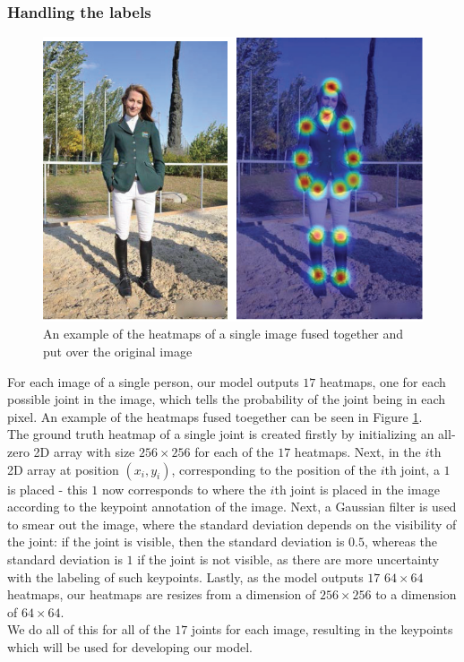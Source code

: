 \documentclass[main.tex]{subfiles}
\begin{document}
\subsubsection{Handling the labels}
\begin{figure}[H]
    \centering
    \includegraphics[height = 4 cm]{./entities/heatmaps_ex.PNG}
    \caption{An example of the heatmaps of a single image fused together and put over the original image \cite{survey_1}}
    \label{fig:heatmaps_ex}
\end{figure}
For each image of a single person, our model outputs $17$ heatmaps, one for each possible joint in the image, which tells the probability of the joint being in each pixel. An example of the heatmaps fused toegether can be seen in Figure \ref{fig:heatmaps_ex}. \\
The ground truth heatmap of a single joint is created firstly by initializing an all-zero 2D array with size $256 \times 256$ for each of the $17$ heatmaps. Next, in the $i$th 2D array at position $(x_i, y_i)$, corresponding to the position of the $i$th joint, a $1$ is placed - this $1$ now corresponds to where the $i$th joint is placed in the image according to the keypoint annotation of the image. Next, a Gaussian filter is used to smear out the image, where the standard deviation depends on the visibility of the joint: if the joint is visible, then the standard deviation is $0.5$, whereas the standard deviation is $1$ if the joint is not visible, as there are more uncertainty with the labeling of such keypoints. Lastly, as the model outputs $17$ $64 \times 64$ heatmaps, our heatmaps are resizes from a dimension of $256 \times 256$ to a dimension of $64 \times 64$. \\
We do all of this for all of the $17$ joints for each image, resulting in the keypoints which will be used for developing our model.
\end{document}
